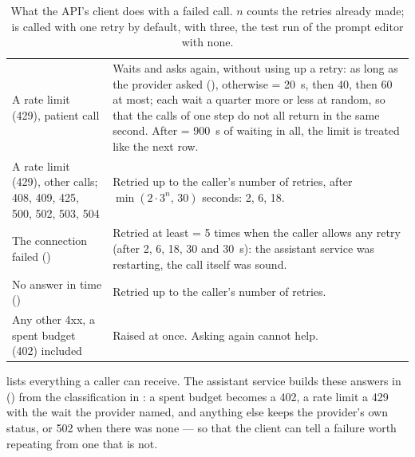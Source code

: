 \begin{table}[H]
\caption{What the API's client does with a failed call. $n$ counts the retries already made;
 is called with one retry by default,  with three, the test run of
the prompt editor with none.}\label{tab:models:retries}
\begin{tabularx}{\textwidth}{@{}L{44mm}Y@{}}
\toprule
{} &  \\
\midrule
A rate limit (429), patient call & Waits and asks again, without using up a retry: as long as the provider asked (), otherwise  = 20~s, then 40, then 60 at most; each wait a quarter more or less at random, so that the calls of one step do not all return in the same second. After  = 900~s of waiting in all, the limit is treated like the next row. \\
A rate limit (429), other calls; 408, 409, 425, 500, 502, 503, 504 & Retried up to the caller's number of retries, after $\min(2\cdot 3^{n},\,30)$ seconds: 2, 6, 18. \\
The connection failed () & Retried at least  = 5 times when the caller allows any retry (after 2, 6, 18, 30 and 30~s): the assistant service was restarting, the call itself was sound. \\
No answer in time () & Retried up to the caller's number of retries. \\
Any other 4xx, a spent budget (402) included & Raised at once. Asking again cannot help. \\
\bottomrule
\end{tabularx}
\end{table}

 lists everything a caller can receive. The assistant service builds
these answers in  () from the classification in
: a spent budget becomes a 402, a rate limit a 429 with the wait
the provider named, and anything else keeps the provider's own status, or 502 when there was
none --- so that the client can tell a failure worth repeating from one that is not.

